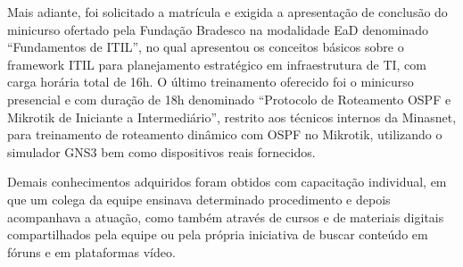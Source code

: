     Mais adiante, foi solicitado a matrícula e exigida a apresentação de conclusão do minicurso ofertado pela Fundação Bradesco na modalidade EaD denominado ``Fundamentos de ITIL'', no qual apresentou os conceitos básicos sobre o framework ITIL para planejamento estratégico em infraestrutura de TI, com carga horária total de 16h. O último treinamento oferecido foi o minicurso presencial e com duração de 18h denominado ``Protocolo de Roteamento OSPF e Mikrotik de Iniciante a Intermediário'', restrito aos técnicos internos da Minasnet, para treinamento de roteamento dinâmico com OSPF no Mikrotik, utilizando o simulador GNS3 bem como dispositivos reais fornecidos.
    
    Demais conhecimentos adquiridos foram obtidos com capacitação individual, em que um colega da equipe ensinava determinado procedimento e depois acompanhava a atuação, como também através de cursos e de materiais digitais compartilhados pela equipe ou pela própria iniciativa de buscar conteúdo em fóruns e em plataformas vídeo.
    
